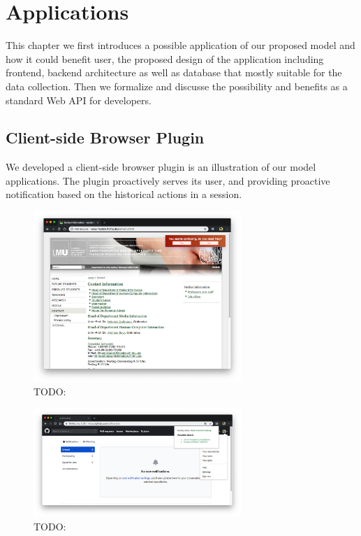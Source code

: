 \section{Applications}
\label{ch:app}

This chapter we first introduces a possible application of our proposed model
and how it could benefit user, the proposed design of the application including frontend, backend architecture as well as database that mostly suitable for the data collection.
Then we formalize and discusse the possibility and benefits as a standard Web API for developers.

\subsection{Client-side Browser Plugin}
\label{sec:plugin}

We developed a client-side browser plugin is an illustration of our model applications.
The plugin proactively serves its user, and providing proactive notification
based on the historical actions in a session.



\begin{figure}[H]
    \centering
    \includegraphics[width=0.7\textwidth]{figures/proactive-noti}
    \caption{TODO:}
    \label{fig:proactive-noti}
\end{figure}


\begin{figure}[H]
    \centering
    \includegraphics[width=0.7\textwidth]{figures/plugin-predicting-result}
    \caption{TODO:}
    \label{fig:plugin-predict}
\end{figure}

